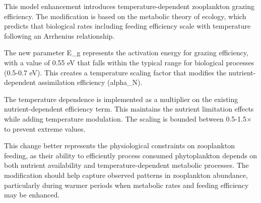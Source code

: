 This model enhancement introduces temperature-dependent zooplankton grazing efficiency. The modification is based on the metabolic theory of ecology, which predicts that biological rates including feeding efficiency scale with temperature following an Arrhenius relationship.

The new parameter E_g represents the activation energy for grazing efficiency, with a value of 0.55 eV that falls within the typical range for biological processes (0.5-0.7 eV). This creates a temperature scaling factor that modifies the nutrient-dependent assimilation efficiency (alpha_N).

The temperature dependence is implemented as a multiplier on the existing nutrient-dependent efficiency term. This maintains the nutrient limitation effects while adding temperature modulation. The scaling is bounded between 0.5-1.5× to prevent extreme values.

This change better represents the physiological constraints on zooplankton feeding, as their ability to efficiently process consumed phytoplankton depends on both nutrient availability and temperature-dependent metabolic processes. The modification should help capture observed patterns in zooplankton abundance, particularly during warmer periods when metabolic rates and feeding efficiency may be enhanced.
